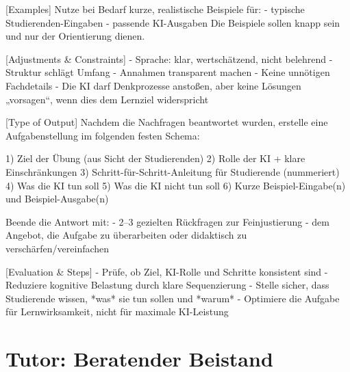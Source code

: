 \documentclass[
  ngerman,
  letterpaper,
  DIV=11]{scrreprt}
\newenvironment{Shaded}{\begin{snugshade}}{\end{snugshade}}
\newcommand{\CommentTok}[1]{\textcolor[rgb]{0.37,0.37,0.37}{#1}}
\newcommand{\NormalTok}[1]{\textcolor[rgb]{0.00,0.23,0.31}{#1}}
\newcommand{\OtherTok}[1]{\textcolor[rgb]{0.00,0.23,0.31}{#1}}
\newcommand{\SpecialStringTok}[1]{\textcolor[rgb]{0.13,0.47,0.30}{#1}}
\begin{document}
\begin{tcolorbox}
\begin{Shaded}
\begin{Highlighting}[]
\CommentTok{[}\OtherTok{Examples}\CommentTok{]}
\NormalTok{Nutze bei Bedarf kurze, realistische Beispiele für:}
\SpecialStringTok{{-} }\NormalTok{typische Studierenden{-}Eingaben}
\SpecialStringTok{{-} }\NormalTok{passende KI{-}Ausgaben}
\NormalTok{Die Beispiele sollen knapp sein und nur der Orientierung dienen.}

\CommentTok{[}\OtherTok{Adjustments \& Constraints}\CommentTok{]}
\SpecialStringTok{{-} }\NormalTok{Sprache: klar, wertschätzend, nicht belehrend}
\SpecialStringTok{{-} }\NormalTok{Struktur schlägt Umfang}
\SpecialStringTok{{-} }\NormalTok{Annahmen transparent machen}
\SpecialStringTok{{-} }\NormalTok{Keine unnötigen Fachdetails}
\SpecialStringTok{{-} }\NormalTok{Die KI darf Denkprozesse anstoßen, aber keine Lösungen „vorsagen“, wenn dies dem Lernziel widerspricht}

\CommentTok{[}\OtherTok{Type of Output}\CommentTok{]}
\NormalTok{Nachdem die Nachfragen beantwortet wurden, erstelle eine Aufgabenstellung im folgenden festen Schema:}

\NormalTok{1) Ziel der Übung (aus Sicht der Studierenden)}
\NormalTok{2) Rolle der KI + klare Einschränkungen}
\NormalTok{3) Schritt{-}für{-}Schritt{-}Anleitung für Studierende (nummeriert)}
\NormalTok{4) Was die KI tun soll}
\NormalTok{5) Was die KI nicht tun soll}
\NormalTok{6) Kurze Beispiel{-}Eingabe(n) und Beispiel{-}Ausgabe(n)}

\NormalTok{Beende die Antwort mit:}
\SpecialStringTok{{-} }\NormalTok{2–3 gezielten Rückfragen zur Feinjustierung}
\SpecialStringTok{{-} }\NormalTok{dem Angebot, die Aufgabe zu überarbeiten oder didaktisch zu verschärfen/vereinfachen}

\CommentTok{[}\OtherTok{Evaluation \& Steps}\CommentTok{]}
\SpecialStringTok{{-} }\NormalTok{Prüfe, ob Ziel, KI{-}Rolle und Schritte konsistent sind}
\SpecialStringTok{{-} }\NormalTok{Reduziere kognitive Belastung durch klare Sequenzierung}
\SpecialStringTok{{-} }\NormalTok{Stelle sicher, dass Studierende wissen, *was* sie tun sollen und *warum*}
\SpecialStringTok{{-} }\NormalTok{Optimiere die Aufgabe für Lernwirksamkeit, nicht für maximale KI{-}Leistung}
\end{Highlighting}
\end{Shaded}

\end{tcolorbox}

\section{Tutor: Beratender Beistand}\label{tutor-beratender-beistand}
\end{document}

